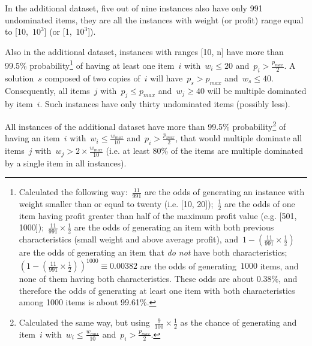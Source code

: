 In the additional dataset, five out of nine instances also have only 991 undominated items, they are all the instances with weight (or profit) range equal to [10,~\(10^3\)] (or [1,~\(10^3\)]).

Also in the additional dataset, instances with ranges [10, n] have more than 99.5\% probability\footnote{Calculated the following way:~\(\frac{11}{991}\) are the odds of generating an instance with weight smaller than or equal to twenty (i.e. [10, 20]);~\(\frac{1}{2}\) are the odds of one item having profit greater than half of the maximum profit value (e.g. [501, 1000]);~\(\frac{11}{991} \times \frac{1}{2}\) are the odds of generating an item with both previous characteristics (small weight and above average profit), and~\(1 - (\frac{11}{991} \times \frac{1}{2})\) are the odds of generating an item that \emph{do not} have both characteristics;~\((1 - (\frac{11}{991} \times \frac{1}{2}))^{1000} \equiv 0.00382\) are the odds of generating~\(1000\) items, and none of them having both characteristics.
These odds are about 0.38\%, and therefore the odds of generating at least one item with both characteristics among 1000 items is about 99.61\%.}
of having at least one item~\(i\) with~\(w_i \leq 20\) and~\(p_i > \frac{p_{max}}{2}\).
A solution~\(s\) composed of two copies of~\(i\) will have~\(p_s > p_{max}\) and~\(w_s \leq 40\).
Consequently, all items~\(j\) with~\(p_j \leq p_{max}\) and~\(w_j \geq 40\) will be multiple dominated by item~\(i\).
Such instances have only thirty undominated items (possibly less).

All instances of the additional dataset have more than 99.5\% probability\footnote{Calculated the same way, but using~\(\frac{9}{100} \times \frac{1}{2}\) as the chance of generating and item~\(i\) with~\(w_i \leq \frac{w_{max}}{10}\) and~\(p_i > \frac{p_{max}}{2}\).} of having an item~\(i\) with~\(w_i \leq \frac{w_{max}}{10}\) and~\(p_i > \frac{p_{max}}{2}\), that would multiple dominate all items~\(j\) with~\(w_j > 2 \times \frac{w_{max}}{10}\) (i.e. at least 80\% of the items are multiple dominated by a single item in all instances).


 
